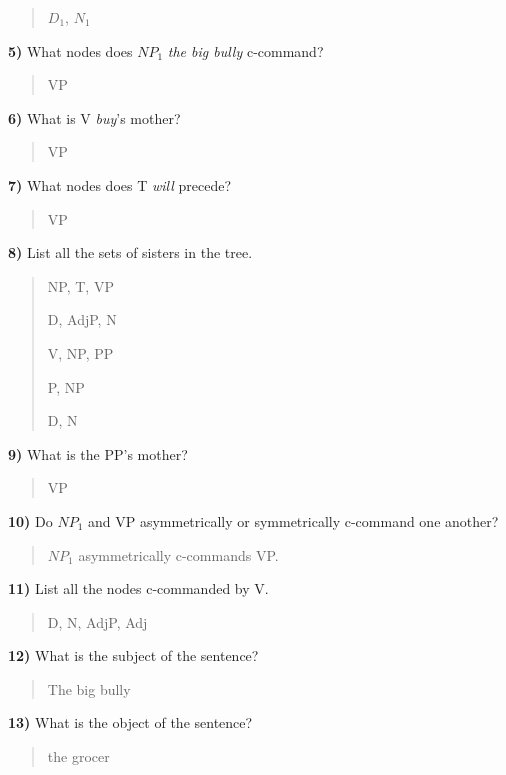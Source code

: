 \documentclass[11pt,notitlepage]{article}
\newcommand{\subquestion}[2]{\par\hspace{0.5cm} \textbf{#1)} #2}
\begin{document}
\begin{quote}
  $D_1$, $N_1$
\end{quote}

\subquestion{5}{What nodes does $NP_1$ \emph{the big bully}
  c-command?}

\begin{quote}
VP
\end{quote}

\subquestion{6}{What is V \emph{buy}’s mother?}

\begin{quote}
  VP
\end{quote}

\subquestion{7}{What nodes does T \emph{will} precede?}

\begin{quote}
VP
\end{quote}

\subquestion{8}{List all the sets of sisters in the tree.}

\begin{quote}
NP, T, VP

D, AdjP, N

V, NP, PP

P, NP

D, N
\end{quote}

\subquestion{9}{What is the PP’s mother?}

\begin{quote}
  VP
\end{quote}

\subquestion{10}{Do $NP_1$ and VP asymmetrically or symmetrically c-command one
another?}

\begin{quote}
$NP_1$ asymmetrically  c-commands VP.
\end{quote}

\subquestion{11}{List all the nodes c-commanded by V.}

\begin{quote}
  D, N, AdjP, Adj
\end{quote}

\subquestion{12}{What is the subject of the sentence?}

\begin{quote}
  The big bully
\end{quote}

\subquestion{13}{What is the object of the sentence?}

\begin{quote}
  the grocer
\end{quote}
\end{document}
